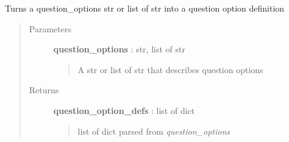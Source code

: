 \documentclass[letterpaper,10pt,english]{sphinxmanual}
\begin{document}

\begin{fulllineitems}
\label{pytan.utils:pytan.utils.dehumanize_question_options}
Turns a question\_options str or list of str into a question option definition
\begin{quote}\begin{description}
\item[{Parameters}] \leavevmode
\textbf{question\_options} : str, list of str
\begin{quote}

A str or list of str that describes question options
\end{quote}

\item[{Returns}] \leavevmode
\textbf{question\_option\_defs} : list of dict
\begin{quote}

list of dict parsed from \emph{question\_options}
\end{quote}

\end{description}\end{quote}

\end{fulllineitems}

\end{document}
